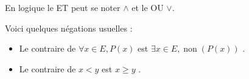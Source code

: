 \begin{notation}
    En logique le \og ET \fg peut se noter $\land$ et le \og OU \fg $\lor$.
\end{notation}

\par \noindent Voici quelques négations usuelles :
\begin{itemize}
    \item Le contraire de \og $\forall x \in E, P(x)$ \fg est \og $\exists x \in E, \operatorname{non}(P(x))$ \fg.
    \item Le contraire de \og $x < y$ \fg est \og $x \geq y$ \fg.
\end{itemize}